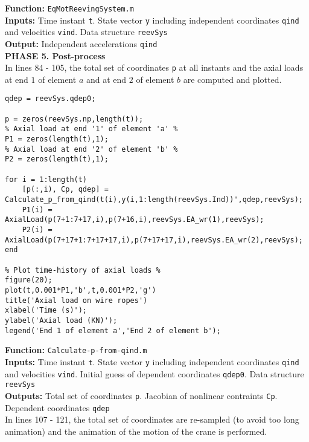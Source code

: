 \setlength{\parindent}{0cm}
\textbf{Function:} \texttt{EqMotReevingSystem.m} \\
\textbf{Inputs:} Time instant \texttt{t}. State vector \texttt{y} including independent coordinates \texttt{qind} and velocities \texttt{vind}. Data structure \texttt{reevSys} \\
\textbf{Output:} Independent accelerations \texttt{qind} \\

\textbf{PHASE 5. Post-process} \\

In lines 84 - 105, the total set of coordinates \texttt{p} at all instants and the axial loads at end $1$ of element $a$ and at end $2$ of element $b$ are computed and plotted. 

{\begin{tcolorbox}\begin{lstlisting}[style=Matlab-editor]
% Calculation of all coordinates all instants %
qdep = reevSys.qdep0;

p = zeros(reevSys.np,length(t));
% Axial load at end '1' of element 'a' %
P1 = zeros(length(t),1);
% Axial load at end '2' of element 'b' %
P2 = zeros(length(t),1);

for i = 1:length(t)
    [p(:,i), Cp, qdep] = Calculate_p_from_qind(t(i),y(i,1:length(reevSys.Ind))',qdep,reevSys);
    P1(i) = AxialLoad(p(7+1:7+17,i),p(7+16,i),reevSys.EA_wr(1),reevSys); 
    P2(i) = AxialLoad(p(7+17+1:7+17+17,i),p(7+17+17,i),reevSys.EA_wr(2),reevSys); 
end

% Plot time-history of axial loads %
figure(20);
plot(t,0.001*P1,'b',t,0.001*P2,'g')
title('Axial load on wire ropes')
xlabel('Time (s)');
ylabel('Axial load (KN)');
legend('End 1 of element a','End 2 of element b');
\end{lstlisting}\end{tcolorbox}}


\setlength{\parindent}{0cm}
\textbf{Function:} \texttt{Calculate-p-from-qind.m} \\
\textbf{Inputs:} Time instant \texttt{t}. State vector \texttt{y} including independent coordinates \texttt{qind} and velocities \texttt{vind}. Initial guess of dependent coordinates \texttt{qdep0}. Data structure \texttt{reevSys} \\
\textbf{Outputs:} Total set of coordinates \texttt{p}. Jacobian of nonlinear contraints \texttt{Cp}. Dependent coordinates \texttt{qdep} \\

In lines 107 - 121, the total set of coordinates are re-sampled (to avoid too long animation) and the animation of the motion of the crane is performed.

